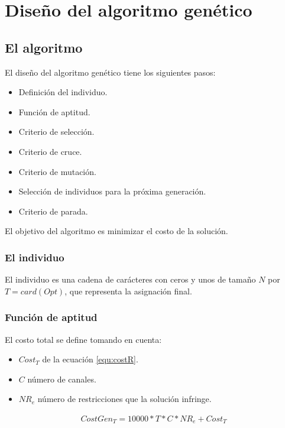 \section{Diseño del algoritmo genético}

\subsection{El algoritmo} \label{sec:algGen}

El diseño del algoritmo genético tiene los siguientes pasos:

\begin{itemize}
	\item Definición del individuo.
	\item Función de aptitud.
	\item Criterio de selección.
	\item Criterio de cruce.
	\item Criterio de mutación.
	\item Selección de individuos para la próxima generación.
	\item Criterio de parada.
\end{itemize}

El objetivo del algoritmo es minimizar el costo de la solución.


\subsubsection{El individuo}

El individuo es una cadena de carácteres con ceros y unos de tamaño $N$ por $T=card(Opt)$, que representa la asignación final.

\subsubsection{Función de aptitud}

El costo total se define tomando en cuenta:

\begin{itemize}
	\item $Cost_{T}$ de la ecuación \ref{equ:costR}.
	\item $C$ número de canales.
	\item $NR_{e}$ número de restricciones que la solución infringe.
\end{itemize}

\begin{equation}
	\label{equ:costGR}
	\begin{array}{cc}
		CostGen_{T} =10000*T*C*NR_{e} + Cost_{T}
	\end{array}
\end{equation}

